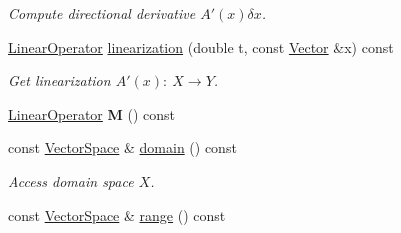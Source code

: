 \begin{DoxyCompactItemize}
\begin{DoxyCompactList}\small\item\em \-Compute directional derivative $A'(x)\delta x$. \end{DoxyCompactList}\item 
\hypertarget{classSpacy_1_1DynamicC1Operator_a3beba5b0012422e11b9c989efe0e224b}{\hyperlink{classSpacy_1_1LinearOperator}{\-Linear\-Operator} \hyperlink{classSpacy_1_1DynamicC1Operator_a3beba5b0012422e11b9c989efe0e224b}{linearization} (double t, const \hyperlink{classSpacy_1_1Vector}{\-Vector} \&x) const }\label{classSpacy_1_1DynamicC1Operator_a3beba5b0012422e11b9c989efe0e224b}

\begin{DoxyCompactList}\small\item\em \-Get linearization $A'(x):\ X\to Y $. \end{DoxyCompactList}\item 
\hypertarget{classSpacy_1_1DynamicC1Operator_a8bef5bf8f2a8dd4e16ba39da1bda78d3}{\hyperlink{classSpacy_1_1LinearOperator}{\-Linear\-Operator} {\bfseries \-M} () const }\label{classSpacy_1_1DynamicC1Operator_a8bef5bf8f2a8dd4e16ba39da1bda78d3}

\item 
\hypertarget{classSpacy_1_1DynamicC1Operator_ac8633283f219699d6a696e866f98fed6}{const \hyperlink{classSpacy_1_1VectorSpace}{\-Vector\-Space} \& \hyperlink{classSpacy_1_1DynamicC1Operator_ac8633283f219699d6a696e866f98fed6}{domain} () const }\label{classSpacy_1_1DynamicC1Operator_ac8633283f219699d6a696e866f98fed6}

\begin{DoxyCompactList}\small\item\em \-Access domain space $X$. \end{DoxyCompactList}\item 
\hypertarget{classSpacy_1_1DynamicC1Operator_a15daaabb27566457a0a3df02a13f9d96}{const \hyperlink{classSpacy_1_1VectorSpace}{\-Vector\-Space} \& \hyperlink{classSpacy_1_1DynamicC1Operator_a15daaabb27566457a0a3df02a13f9d96}{range} () const }\label{classSpacy_1_1DynamicC1Operator_a15daaabb27566457a0a3df02a13f9d96}


\end{DoxyCompactItemize}
